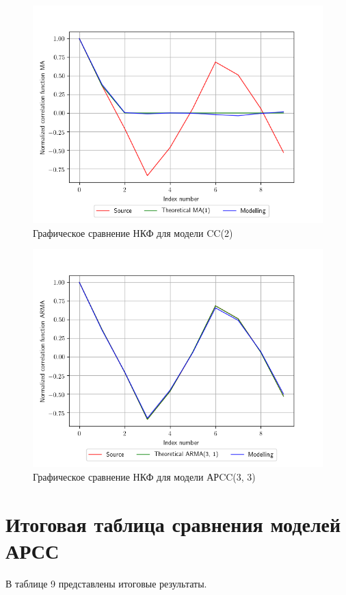 \documentclass[12pt, fleqn]{article}
\begin{document}
{{		\begin{figure}[H]
			\includegraphics{plot_ma_ncf.png}
			\caption{Графическое сравнение НКФ для модели CC(2)}
		\end{figure}
		  	
		\begin{figure}[H]
			\includegraphics{plot_arma_ncf.png}
			\caption{Графическое сравнение НКФ для модели АРCC(3, 3)}
		\end{figure}
	} 
				
	\newpage
	\section{Итоговая таблица сравнения моделей АРСС}
	{
		В таблице 9 представлены итоговые результаты.
			  
}}
\end{document}
